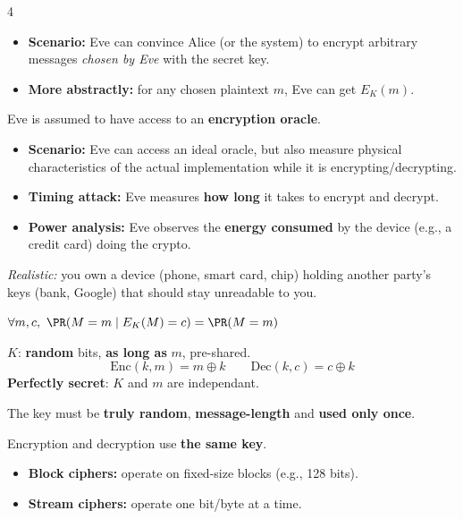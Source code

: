 \documentclass[8pt,a4paper,landscape]{extarticle}
\begin{document}
\begin{multicols*}{4}
\begin{atk}[title=Active model 2: Chosen Plaintext Attack (CPA)]
    \begin{itemize}
        \item \textbf{Scenario:} Eve can convince Alice (or the system) to encrypt arbitrary messages \textit{chosen by Eve} with the secret key.
        \item \textbf{More abstractly:} for any chosen plaintext $m$, Eve can get $E_K(m)$.
    \end{itemize}
    Eve is assumed to have access to an \textbf{encryption oracle}.
\end{atk}

\begin{atk}[title=Practical threat model: Side-channel attacks]
    \begin{itemize}
        \item \textbf{Scenario:} Eve can access an ideal oracle, but also measure physical characteristics of the actual implementation while it is encrypting/decrypting.
        \item \textbf{Timing attack:} Eve measures \textbf{how long} it takes to encrypt and decrypt.
        \item \textbf{Power analysis:} Eve observes the \textbf{energy consumed} by the device (e.g., a credit card) doing the crypto.
    \end{itemize}
    \textit{Realistic:} you own a device (phone, smart card, chip) holding another party's keys (bank, Google) that should stay unreadable to you.
\end{atk}

\begin{thm}[title=Perfect secrecy]
    $\forall m, c,\ \PR(M = m \mid E_K(M) = c) = \PR(M = m)$
\end{thm}

\begin{defn}[title=One-time pad (OTP)]
    $K$: \textbf{random} bits, \textbf{as long as} $m$, pre-shared.
    \[ \mathrm{Enc}(k, m) = m \oplus k \qquad \mathrm{Dec}(k, c) = c \oplus k \]
    \textbf{Perfectly secret}: $K$ and $m$ are independant.
\end{defn}

\begin{warn}[title=The key problem of OTP]
    The key must be \textbf{truly random}, \textbf{message-length} and \textbf{used only once}.
\end{warn}

\begin{defn}[title=Two main types of symmetric schemes]
    Encryption and decryption use \textbf{the same key}.
    \begin{itemize}
        \item \textbf{Block ciphers:} operate on fixed-size blocks (e.g., 128 bits).
        \item \textbf{Stream ciphers:} operate one bit/byte at a time.
    \end{itemize}
\end{defn}


\end{multicols*}
\end{document}
